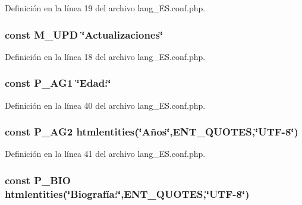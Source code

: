 Definición en la línea 19 del archivo lang\-\_\-\-E\-S.\-conf.\-php.

\hypertarget{lang__ES_8conf_8php_aa05f4b68a1c61dd74d97c3a7c79f1efd}{
\subsubsection[{M\-\_\-\-U\-P\-D}]{\setlength{\rightskip}{0pt plus 5cm}const M\-\_\-\-U\-P\-D \char`\"{}Actualizaciones\char`\"{}}}\label{lang__ES_8conf_8php_aa05f4b68a1c61dd74d97c3a7c79f1efd}


Definición en la línea 18 del archivo lang\-\_\-\-E\-S.\-conf.\-php.

\hypertarget{lang__ES_8conf_8php_af6b35f13bb73067e81a911449cb0b89b}{
\subsubsection[{P\-\_\-\-A\-G1}]{\setlength{\rightskip}{0pt plus 5cm}const P\-\_\-\-A\-G1 \char`\"{}Edad\-:\char`\"{}}}\label{lang__ES_8conf_8php_af6b35f13bb73067e81a911449cb0b89b}


Definición en la línea 40 del archivo lang\-\_\-\-E\-S.\-conf.\-php.

\hypertarget{lang__ES_8conf_8php_ae0a798c192c8f5a02ae9e12a5ff20c68}{
\subsubsection[{P\-\_\-\-A\-G2}]{\setlength{\rightskip}{0pt plus 5cm}const P\-\_\-\-A\-G2 htmlentities(\char`\"{}Años\char`\"{},E\-N\-T\-\_\-\-Q\-U\-O\-T\-E\-S,\char`\"{}U\-T\-F-\/8\char`\"{})}}\label{lang__ES_8conf_8php_ae0a798c192c8f5a02ae9e12a5ff20c68}


Definición en la línea 41 del archivo lang\-\_\-\-E\-S.\-conf.\-php.

\hypertarget{lang__ES_8conf_8php_a333498935f4e2cb6c3904bd31379e25e}{
\subsubsection[{P\-\_\-\-B\-I\-O}]{\setlength{\rightskip}{0pt plus 5cm}const P\-\_\-\-B\-I\-O htmlentities(\char`\"{}Biografía\-:\char`\"{},E\-N\-T\-\_\-\-Q\-U\-O\-T\-E\-S,\char`\"{}U\-T\-F-\/8\char`\"{})}}\label{lang__ES_8conf_8php_a333498935f4e2cb6c3904bd31379e25e}


